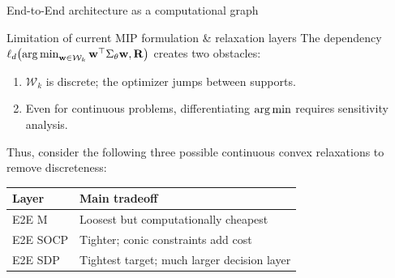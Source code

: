 \documentclass[10pt,aspectratio=169]{beamer}
\newcommand{\Kcard}{k}
\newcommand{\Wset}{\mathcal{W}}
\newcommand{\Param}{\theta}
\newcommand{\SigmaMat}{\Sigma}
\begin{document}
\begin{frame}{End-to-End architecture as a computational graph}
{
  }
\end{frame}


\begin{frame}{Limitation of current MIP formulation \& relaxation layers}
    \small 
The dependency $\ell_d\!\left(\argmin_{\mathbf{w}\in\Wset_\Kcard}\mathbf{w}^\top \SigmaMat_\Param \mathbf{w},\mathbf{R}\right)$ creates two obstacles:

{\addtolength{\leftmargini}{1em}
\begin{enumerate}
  \item $\Wset_\Kcard$ is discrete; the optimizer jumps between supports.
  \item Even for continuous problems, differentiating $\operatorname*{arg\,min}$ requires sensitivity analysis.
\end{enumerate}
}

Thus, consider the following three possible continuous convex relaxations to remove discreteness:
\vspace{1em}

{
\centering
\begin{tabular}{>{\raggedright\arraybackslash}p{.2\linewidth}
                >{\raggedright\arraybackslash}p{.44\linewidth}}
  \toprule
  Layer & Main tradeoff \\
  \midrule
  E2E M & Loosest but computationally cheapest \\
  E2E SOCP \cite{CuiZhengZhuSun2013Relaxations} & Tighter; conic constraints add cost \\
  E2E SDP \cite{WiegeleZhao2022SDP} & Tightest target; much larger decision layer \\
  \bottomrule
\end{tabular}
\par
}

\end{frame}
\end{document}
